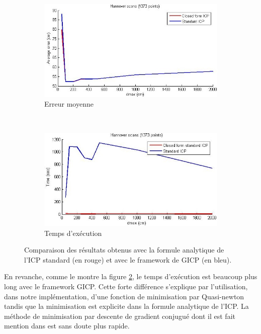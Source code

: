 \begin{figure}[!h]
   \centering
   \begin{subfigure}[t]{.5\linewidth}
     \centering
     \includegraphics[scale=0.4]{Images/Resultats/hannover_diff_ICP_closed_form_dmax.jpg}
     \caption{Erreur moyenne}
     \label{fig:CFICP:err}
   \end{subfigure}%
   ~
   \begin{subfigure}[t]{.5\linewidth}
     \centering
     \includegraphics[scale=0.4]{Images/Resultats/hannover_diff_time_ICP_closed_form_dmax.jpg}
     \caption{Temps d'exécution}
     \label{fig:CFICP:time}
   \end{subfigure}
   
   \caption{Comparaison des résultats obtenus avec la formule analytique de l'ICP standard (en rouge) et avec le framework de GICP (en bleu).}
   \label{fig:closedform_ICP}
\end{figure}

En revanche, comme le montre la figure \ref{fig:CFICP:time}, le temps d'exécution est beaucoup plus long avec le framework GICP. Cette forte différence s'explique par l'utilisation, dans notre implémentation, d'une fonction de minimisation par Quasi-newton tandis que la minimisation est explicite dans la formule analytique de l'ICP. La méthode de minimisation par descente de gradient conjugué dont il est fait mention dans \cite{bib_gicp} est sans doute plus rapide. 